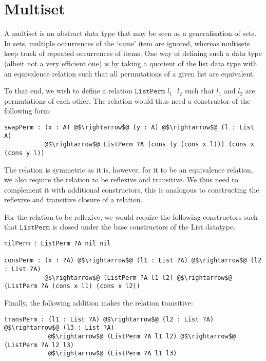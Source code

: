 \documentclass[12pt,twoside,maitrise]{dms}
\theoremstyle{definition}
\numberwithin{equation}{section}
\numberwithin{table}{chapter}
\numberwithin{figure}{chapter}
\newcommand\fn[1] {\texttt{#1}}
\begin{document}
\section{Multiset}\label{sec:multiset}

A multiset is an abstract data type that may be seen as a generalisation of
sets. In sets, multiple occurrences of the `same' item are ignored, whereas
multisets keep track of repeated occurrences of items. One way of defining such
a data type (albeit not a very efficient one) is by taking a quotient of the
list data type with an equivalence relation such that all permutations of a
given list are equivalent.

To that end, we wish to define a relation $\fn{ListPerm $l_1$ $l_2$}$ such that
$\fn{$l_1$}$ and $\fn{$l_2$}$ are permutations of each other. The relation would
thus need a constructor of the following form:

\begin{verbatim}
swapPerm : (x : A) @$\rightarrow$@ (y : A) @$\rightarrow$@ (l : List A)
           @$\rightarrow$@ ListPerm ?A (cons (y (cons x l))) (cons x (cons y l))
\end{verbatim}

The relation is symmetric as it is, however, for it to be an equivalence
relation, we also require the relation to be reflexive and transitive. We thus
need to complement it with additional constructors, this is analogous to
constructing the reflexive and transitive closure of a relation.

For the relation to be reflexive, we would require the following constructors
such that $\fn{ListPerm}$ is closed under the base constructors of the List
datatype.

\begin{verbatim}
nilPerm : ListPerm ?A nil nil

consPerm : (x : ?A) @$\rightarrow$@ (l1 : List ?A) @$\rightarrow$@ (l2 : List ?A)
           @$\rightarrow$@ (ListPerm ?A l1 l2) @$\rightarrow$@ (ListPerm ?A (cons x l1) (cons x l2))
\end{verbatim}

Finally, the following addition makes the relation transitive:

\begin{verbatim}
transPerm : (l1 : List ?A) @$\rightarrow$@ (l2 : List ?A) @$\rightarrow$@ (l3 : List ?A)
            @$\rightarrow$@ (ListPerm ?A l1 l2) @$\rightarrow$@ (ListPerm ?A l2 l3)
            @$\rightarrow$@ (ListPerm ?A l1 l3)
\end{verbatim}
\end{document}

